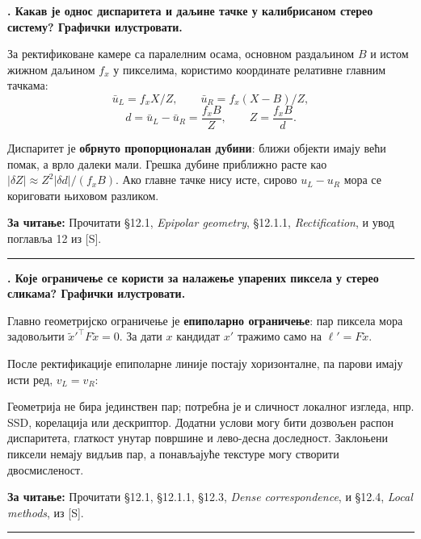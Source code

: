 \documentclass[10pt,a4paper]{article}
\newcommand{\en}[1]{\textit{#1}}
\newcounter{pitanje}
\newenvironment{odgovor}[1]{\stepcounter{pitanje}\begin{minipage}[t][0.455\textheight][t]{\textwidth}\vspace{0pt}\textbf{\thepitanje. #1}\par\smallskip}{\end{minipage}\par\ifodd\value{pitanje}\vspace{0.025\textheight}\hrule\vspace{0.015\textheight}\else\newpage\fi}
\newcommand{\izvor}[1]{\par\vfill{\footnotesize\textbf{За читање:} #1}\par}
\begin{document}
\begin{odgovor}{Какав је однос диспаритета и даљине тачке у калибрисаном стерео систему? Графички илустровати.}
За ректификоване камере са паралелним осама, основном раздаљином $B$ и истом жижном даљином $f_x$ у пикселима, користимо координате релативне главним тачкама:
\[
\bar u_L=f_xX/Z,\qquad \bar u_R=f_x(X-B)/Z,
\]
\[
d=\bar u_L-\bar u_R=\frac{f_xB}{Z},\qquad \boxed{Z=\frac{f_xB}{d}}.
\]
\begin{center}\end{center}
Диспаритет је \textbf{обрнуто пропорционалан дубини}: ближи објекти имају већи помак, а врло далеки мали. Грешка дубине приближно расте као $|\delta Z|\approx Z^2|\delta d|/(f_xB)$. Ако главне тачке нису исте, сирово $u_L-u_R$ мора се кориговати њиховом разликом.
\izvor{Прочитати §12.1, \en{Epipolar geometry}, §12.1.1, \en{Rectification}, и увод поглавља 12 из [S].}
\end{odgovor}

\begin{odgovor}{Које ограничење се користи за налажење упарених пиксела у стерео сликама? Графички илустровати.}
Главно геометријско ограничење је \textbf{епиполарно ограничење}: пар пиксела мора задовољити $\widetilde x'^\top F\widetilde x=0$. За дати $x$ кандидат $x'$ тражимо само на $\ell'=F\widetilde x$.

После ректификације епиполарне линије постају хоризонталне, па парови имају исти ред, $v_L=v_R$:
\begin{center}\end{center}
Геометрија не бира јединствен пар; потребна је и сличност локалног изгледа, нпр. SSD, корелација или дескриптор. Додатни услови могу бити дозвољен распон диспаритета, глаткост унутар површине и лево-десна доследност. Заклоњени пиксели немају видљив пар, а понављајуће текстуре могу створити двосмисленост.
\izvor{Прочитати §12.1, §12.1.1, §12.3, \en{Dense correspondence}, и §12.4, \en{Local methods}, из [S].}
\end{odgovor}
\end{document}
